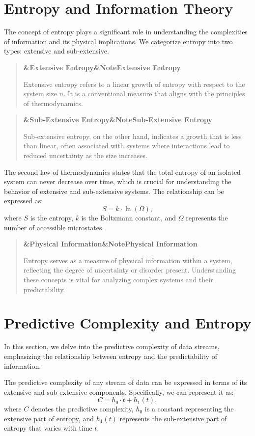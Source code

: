 \documentclass[a4paper]{article}
\newcommand{\boxheading}[1]{%
  \par\smallskip
  \noindent\textbf{\ifx&#1&Note\else#1\fi}\par
  \smallskip
}
\newenvironment{defbox}[1][]{%
  \begin{quote}\color{green!40!black}\boxheading{#1}\normalcolor
}{\end{quote}}
\newenvironment{rembox}[1][]{%
  \begin{quote}\color{black!70}\boxheading{#1}\normalcolor
}{\end{quote}}
\begin{document}
\section{Entropy and Information Theory}
The concept of entropy plays a significant role in understanding the complexities of information and its physical implications. We categorize entropy into two types: extensive and sub-extensive.

\begin{defbox}[Extensive Entropy]
Extensive entropy refers to a linear growth of entropy with respect to the system size \( n \). It is a conventional measure that aligns with the principles of thermodynamics.
\end{defbox}

\begin{defbox}[Sub-Extensive Entropy]
Sub-extensive entropy, on the other hand, indicates a growth that is less than linear, often associated with systems where interactions lead to reduced uncertainty as the size increases.
\end{defbox}

The second law of thermodynamics states that the total entropy of an isolated system can never decrease over time, which is crucial for understanding the behavior of extensive and sub-extensive systems. The relationship can be expressed as:
\[
S = k \cdot \ln(\Omega),
\]
where \( S \) is the entropy, \( k \) is the Boltzmann constant, and \( \Omega \) represents the number of accessible microstates.

\begin{rembox}[Physical Information]
Entropy serves as a measure of physical information within a system, reflecting the degree of uncertainty or disorder present. Understanding these concepts is vital for analyzing complex systems and their predictability.
\end{rembox}

\section{Predictive Complexity and Entropy}
In this section, we delve into the predictive complexity of data streams, emphasizing the relationship between entropy and the predictability of information.

The predictive complexity of any stream of data can be expressed in terms of its extensive and sub-extensive components. Specifically, we can represent it as:
\begin{equation}
C = h_0 \cdot t + h_1(t),
\end{equation}
where \( C \) denotes the predictive complexity, \( h_0 \) is a constant representing the extensive part of entropy, and \( h_1(t) \) represents the sub-extensive part of entropy that varies with time \( t \).
\end{document}
